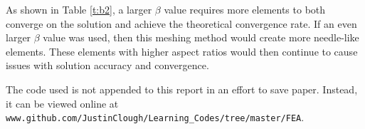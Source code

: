 \documentclass[a4paper, 12pt]{article}
\begin{document}
As shown in Table \ref{t:b2}, a larger $\beta$ value 
requires more elements to both converge on the solution
and achieve the theoretical convergence rate.
If an even larger $\beta$ value was used, then this meshing method 
would create more needle-like elements.
These elements with higher aspect ratios would then 
continue to cause issues with solution accuracy and convergence.

The code used is not appended to this report in 
an effort to save paper.
Instead, it can be viewed online at
\texttt{www.github.com/JustinClough/Learning\_Codes/tree/master/FEA}.
\end{document}
